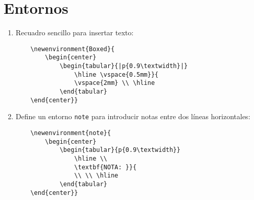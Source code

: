 \documentclass[11pt,a4paper]{article}
\begin{document}
\section{Entornos}

\begin{enumerate}
	
\item Recuadro sencillo para insertar texto:
\begin{verbatim}
	\newenvironment{Boxed}{
		\begin{center}
			\begin{tabular}{|p{0.9\textwidth}|}
				\hline \vspace{0.5mm}}{
				\vspace{2mm} \\ \hline
			\end{tabular}
	\end{center}}
\end{verbatim}

\item Define un entorno \texttt{note} para introducir notas entre dos líneas horizontales:
\begin{verbatim}
	\newenvironment{note}{
		\begin{center}
			\begin{tabular}{p{0.9\textwidth}}
				\hline \\
				\textbf{NOTA: }}{
				\\ \\ \hline
			\end{tabular}
	\end{center}}
\end{verbatim}

\end{enumerate}
\end{document}
